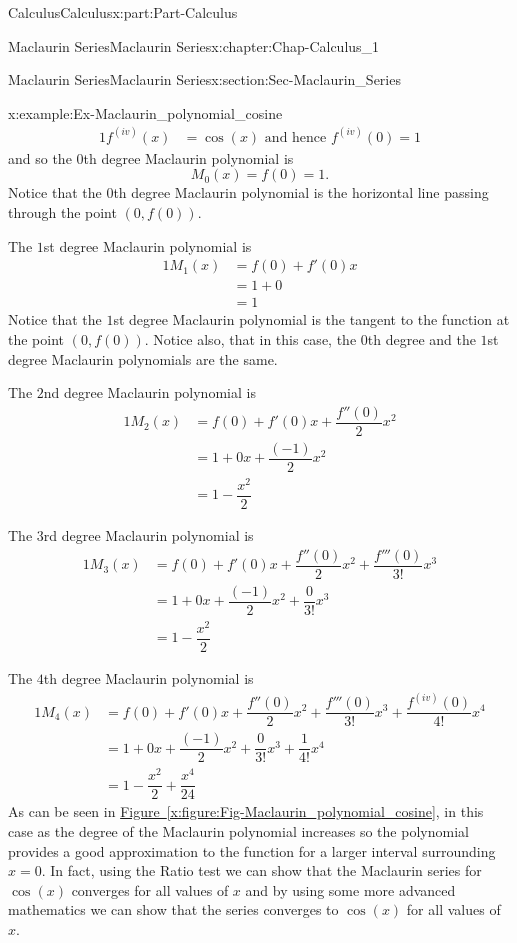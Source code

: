 \documentclass[oneside,10pt,]{book}
\newcommand{\xreffont}{\relax}
\numberwithin{equation}{section}
\newcommand{\amp}{&}
\begin{document}
\begin{partptx}{Calculus}{}{Calculus}{}{}{x:part:Part-Calculus}
\begin{chapterptx}{Maclaurin Series}{}{Maclaurin Series}{}{}{x:chapter:Chap-Calculus_1}
\begin{sectionptx}{Maclaurin Series}{}{Maclaurin Series}{}{}{x:section:Sec-Maclaurin_Series}
\begin{example}{}{x:example:Ex-Maclaurin_polynomial_cosine}
\begin{alignat*}{1}
f^{(iv)}(x) \amp = \cos(x) \text{ and hence } f^{(iv)}(0)=1
\end{alignat*}
and so the \(0\)th degree Maclaurin polynomial is%
\begin{equation*}
M_0(x)=f(0)=1.
\end{equation*}
Notice that the \(0\)th degree Maclaurin polynomial is the horizontal line passing through the point \((0,f(0))\).%
\par
The \(1\)st degree Maclaurin polynomial is%
\begin{alignat*}{1}
M_1(x) \amp = f(0) + f'(0)x\\
\amp = 1+0\\
\amp = 1
\end{alignat*}
Notice that the \(1\)st degree Maclaurin polynomial is the tangent to the function at the point  \((0,f(0))\). Notice also, that in this case, the \(0\)th degree and the \(1\)st  degree Maclaurin polynomials are the same.%
\par
The \(2\)nd degree Maclaurin polynomial is%
\begin{alignat*}{1}
M_2(x) \amp = f(0) + f'(0)x + \dfrac{f''(0)}{2}x^2\\
\amp = 1+0x + \dfrac{(-1)}{2}x^2\\
\amp = 1-\dfrac{x^2}{2}
\end{alignat*}
%
\par
The \(3\)rd degree Maclaurin polynomial is%
\begin{alignat*}{1}
M_3(x)  \amp = f(0) + f'(0)x + \dfrac{f''(0)}{2}x^2 + \dfrac{f'''(0)}{3!}x^3\\
\amp = 1+0x + \dfrac{(-1)}{2}x^2 + \dfrac{0}{3!}x^3\\
\amp = 1-\dfrac{x^2}{2}
\end{alignat*}
%
\par
The \(4\)th degree Maclaurin polynomial is%
\begin{alignat*}{1}
M_4(x)  \amp = f(0) + f'(0)x + \dfrac{f''(0)}{2}x^2 + \dfrac{f'''(0)}{3!}x^3 + \dfrac{f^{(iv)}(0)}{4!}x^4\\
\amp = 1+0x + \dfrac{(-1)}{2}x^2 + \dfrac{0}{3!}x^3 + \dfrac{1}{4!}x^4\\
\amp = 1-\dfrac{x^2}{2} + \dfrac{x^4}{24}
\end{alignat*}
As can be seen in \hyperref[x:figure:Fig-Maclaurin_polynomial_cosine]{Figure~{\xreffont\ref{x:figure:Fig-Maclaurin_polynomial_cosine}}}, in this case as the degree of the Maclaurin polynomial increases so the polynomial provides a good approximation to the function for a larger interval surrounding \(x=0\). In fact, using the Ratio test we can show that the Maclaurin series for \(\cos(x)\) converges for all values of \(x\) and by using some more advanced mathematics we can show that the series converges to \(\cos(x)\) for all values of \(x\).%

\end{example}
\end{sectionptx}
\end{chapterptx}
\end{partptx}
\end{document}

